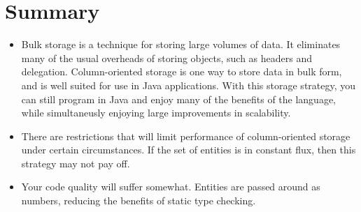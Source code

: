 \section{Summary}

\begin{itemize}
  \item Bulk storage is a technique for storing large volumes of data. It
  eliminates many of the usual overheads of storing objects, such as headers and
  delegation. Column-oriented storage is one way to store data in bulk form,
  and is well suited for use in Java applications. With this storage
  strategy, you can still program in Java and enjoy many of the benefits of the
  language, while simultaneusly enjoying large improvements in scalability.
  \item There are restrictions that will limit performance of column-oriented
  storage under certain circumstances. If the set of entities is in constant
  flux, then this strategy may not pay off.
  \item Your code quality will suffer somewhat. Entities are passed around as
  numbers, reducing the benefits of static type checking.
\end{itemize}



